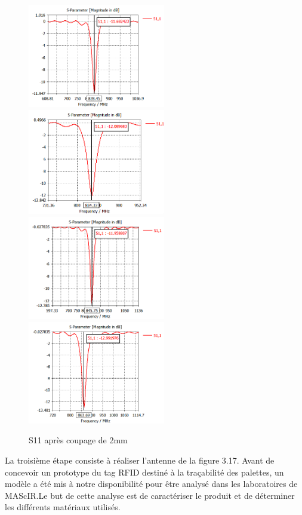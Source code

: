 \documentclass[11pt, a4paper, twoside]{book}
\begin{document}
\begin{figure}[H]
\centering
\includegraphics[width=6cm]{11}
\includegraphics[width=6cm]{22}\\
\includegraphics[width=6cm]{33}
\includegraphics[width=6cm]{44}
\caption{S11 après coupage de 2mm }
\end{figure}

La troisième étape  consiste à réaliser l'antenne de la figure 3.17. 
Avant de concevoir un prototype du tag RFID destiné à la traçabilité des palettes, un modèle a été mis à notre disponibilité pour être analysé dans les laboratoires de MAScIR.Le but de cette analyse est de caractériser le produit et de déterminer les différents matériaux utilisés.\\
\end{document}
